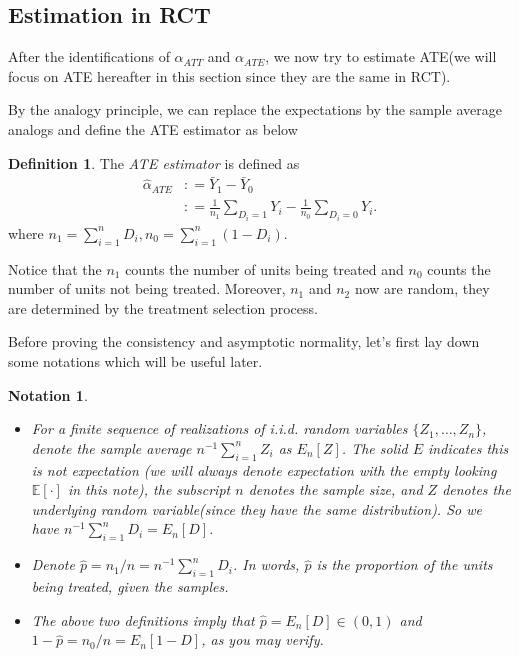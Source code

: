 \documentclass[11pt,a4paper]{amsart}
\theoremstyle{plain}
\newtheorem*{notation*}{Notation}
\theoremstyle{definition}
\newtheorem{definition}{Definition}
\begin{document}
\subsection{Estimation in RCT}\hfill\par 
	After the identifications of $\alpha_{ATT}$ and $\alpha_{ATE}$, we now try to estimate ATE(we will focus on ATE hereafter in this section since they are the same in RCT).\par 
	By the analogy principle, we can replace the expectations by the sample average analogs
	 and define the ATE estimator as below
	\begin{definition}
		The \textit{ATE estimator} is defined as 
		\[
		\begin{aligned}
		\widehat{\alpha}_{A T E} &: =\bar{Y}_{1}-\bar{Y}_{0} \\
		&: =\frac{1}{n_{1}} \sum_{D_{i}=1} Y_{i}-\frac{1}{n_{0}} \sum_{D_{i}=0} Y_{i}.
		\end{aligned}
		\]
		where $n_{1}=\sum_{i=1}^{n} D_{i}, n_{0}=\sum_{i=1}^{n}\left(1-D_{i}\right)$.
	\end{definition}
 	Notice that the $n_{1}$ counts the number of units being treated and $n_{0}$ counts the number of units not being treated.  Moreover, $n_{1}$ and $n_{2}$ now are random, they are determined by the treatment selection process.\par 
 	Before proving the consistency and asymptotic normality, let's first lay down some notations which will be useful later. 
 	\begin{notation*}\hfill
 		\begin{itemize}
 			\item For a finite sequence of realizations of i.i.d. random variables $\{Z_{1}, \dots, Z_{n}\}$, denote the sample average $n^{-1}\sum_{i = 1}^{n}Z_{i}$ as  $E_{n}[Z]$. The solid $E$ indicates this is not expectation (we will always denote expectation with the empty looking $\mathbb{E}[\cdot]$ in this note), the subscript $n$ denotes the sample size, and $Z$ denotes the underlying random variable(since they have the same distribution).  So we have $n^{-1} \sum_{i = 1}^{n} D_{i} = E_{n}[D]$.
 			\item Denote $\hat{p} = n_{1}/n = n^{-1}\sum_{i=1}^{n}D_{i}$. In words, $\hat{p}$ is the proportion of the units being treated, \emph{given the samples}. 
 			\item The above two definitions imply that $\hat{p} = E_{n}[D] \in (0,1)$ and $1-\hat{p} = n_{0}/n = E_{n}[1-D]$, as you may verify.
 		\end{itemize}
 	\end{notation*}
\end{document}
